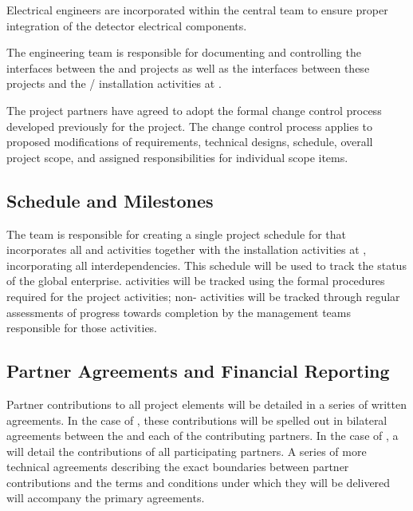 Electrical engineers are incorporated within the central  
team to ensure proper integration of the detector electrical 
components. 

The  engineering team is responsible for documenting and
controlling the interfaces between the  and  
projects as well as the interfaces between these projects and the 
/  installation activities at .  

The  project partners have agreed to adopt 
the formal change control process developed previously for the 
 project.  The change control process applies to 
proposed modifications of requirements, technical designs, 
schedule, overall project scope, and assigned responsibilities 
for individual scope items. 

\subsection{Schedule and Milestones}   %
\label{sec:dune_schedule}

The  team is responsible for creating a single project
schedule for  that incorporates all  and
 activities together with the installation activities at
, incorporating all interdependencies.  This schedule
will be used to track the status of the global enterprise.   %
 activities will be 
tracked using the formal  procedures required for the 
 project activities; non- activities will be tracked through regular assessments 
of progress towards completion by the management teams responsible 
for those activities. 



\subsection{Partner Agreements and Financial Reporting}   %
\label{sec:dune_agreements}

Partner contributions to all project elements will be detailed 
in a series of written agreements.  In the case of , 
these contributions will be spelled out in bilateral agreements 
between the  and each of the contributing partners.  In 
the case of ,  a  will 
detail the contributions of all participating partners.  
A series of more technical agreements describing the exact 
boundaries between partner contributions and the terms and 
conditions under which they will be delivered will %
accompany the primary agreements.  



